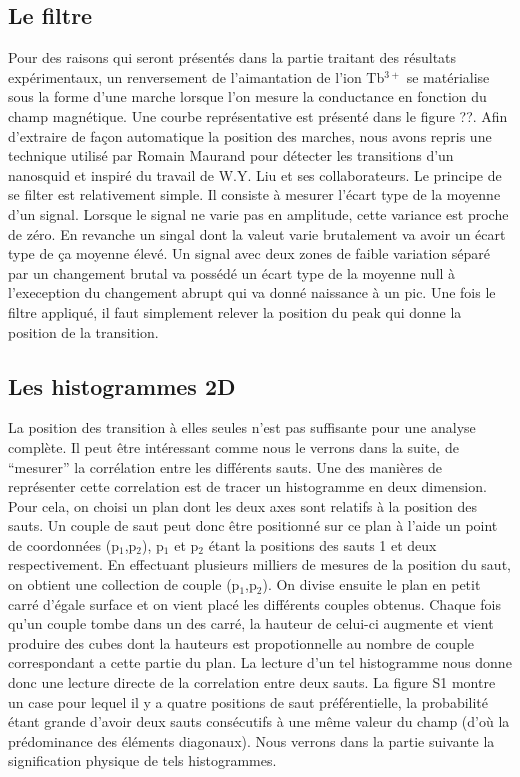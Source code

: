 \subsection{Le filtre}
Pour des raisons qui seront présentés dans la partie traitant des résultats expérimentaux, un renversement de l'aimantation de l'ion Tb$^{3+}$ se matérialise sous la forme d'une marche lorsque l'on mesure la conductance en fonction du champ magnétique. Une courbe représentative est présenté dans le figure ??. Afin d'extraire de façon automatique la position des marches, nous avons repris une technique utilisé par Romain Maurand pour détecter les transitions d'un nanosquid et inspiré du travail de W.Y. Liu et ses collaborateurs. Le principe de se filter est relativement simple. Il consiste à mesurer l'écart type de la moyenne d'un signal. Lorsque le signal ne varie pas en amplitude, cette variance est proche de zéro. En revanche un singal dont la valeut varie brutalement va avoir un écart type de ça moyenne élevé. Un signal avec deux zones de faible variation séparé par un changement brutal va possédé un écart type de la moyenne null à l'exeception du changement abrupt qui va donné naissance à un pic. Une fois le filtre appliqué, il faut simplement relever la position du peak qui donne la position de la transition.

\subsection{Les histogrammes 2D}
La position des transition à elles seules n'est pas suffisante pour une analyse complète. Il peut être intéressant comme nous le verrons dans la suite, de ``mesurer'' la corrélation entre les différents sauts. Une des manières de représenter cette correlation est de tracer un histogramme en deux dimension. Pour cela, on choisi un plan dont les deux axes sont relatifs à la position des sauts. Un couple de saut peut donc être positionné sur ce plan à l'aide un point de coordonnées (p$_1$,p$_2$), p$_1$ et p$_2$ étant la positions des sauts 1 et deux respectivement. En effectuant plusieurs milliers de mesures de la position du saut, on obtient une collection de couple (p$_1$,p$_2$). On divise ensuite le plan en petit carré d'égale surface et on vient placé les différents couples obtenus. Chaque fois qu'un couple tombe dans un des carré, la hauteur de celui-ci augmente et vient produire des cubes dont la hauteurs est propotionnelle au nombre de couple correspondant a cette partie du plan. La lecture d'un tel histogramme nous donne donc une lecture directe de la correlation entre deux sauts. La figure S1 montre un case pour lequel il y a quatre positions de saut préférentielle, la probabilité étant grande d'avoir deux sauts consécutifs à une même valeur du champ (d'où la prédominance des éléments diagonaux). Nous verrons dans la partie suivante la signification physique de tels histogrammes.


